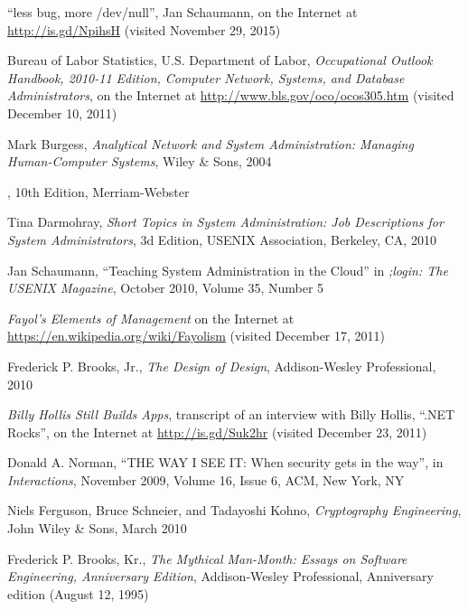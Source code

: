 \pagebreak


\begin{thebibliography}{99}

``less bug, more /dev/null'',
Jan Schaumann, on the Internet at
\url{http://is.gd/NpihsH} (visited November 29,
2015)

Bureau of Labor Statistics, U.S.  Department of Labor,
{\em Occupational Outlook Handbook, 2010-11 Edition, Computer Network, Systems,
and Database Administrators}, on the Internet at
\url{http://www.bls.gov/oco/ocos305.htm} (visited December 10, 2011)

Mark Burgess, {\em Analytical Network and
System Administration: Managing Human-Computer Systems}, Wiley \& Sons,
2004

, 10th Edition,
Merriam-Webster

Tina Darmohray, {\em Short Topics in System
Administration: Job Descriptions for System Administrators}, 3d Edition,
USENIX Association, Berkeley, CA, 2010

Jan Schaumann, ``Teaching System
Administration in the Cloud'' in {\em ;login: The USENIX Magazine},
October 2010, Volume 35, Number 5

 {\em Fayol's Elements of Management} on the
Internet at \url{https://en.wikipedia.org/wiki/Fayolism} (visited December
17, 2011)

Frederick P. Brooks, Jr., {\em The Design of
Design}, Addison-Wesley Professional, 2010

 {\em Billy Hollis Still Builds
Apps}, transcript of an interview with Billy Hollis,
``.NET Rocks'', on the Internet at
\url{http://is.gd/Suk2hr} (visited December 23, 2011)

Donald A. Norman, ``THE WAY I SEE IT: When
security gets in the way'', in {\em Interactions}, November 2009, Volume
16, Issue 6, ACM, New York, NY

Niels Ferguson, Bruce Schneier, and Tadayoshi Kohno,
{\em Cryptography Engineering}, John Wiley \& Sons, March 2010

Frederick P. Brooks, Kr., {\em The Mythical
Man-Month: Essays on Software Engineering, Anniversary Edition},
Addison-Wesley Professional, Anniversary edition (August 12, 1995)


\end{thebibliography}
